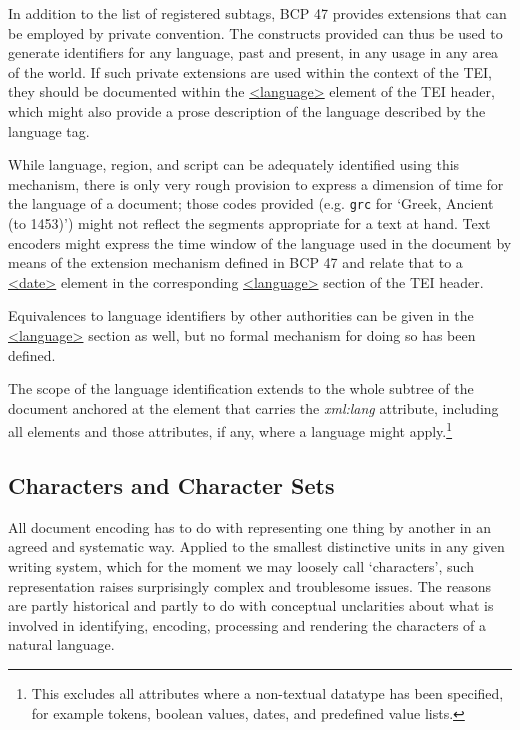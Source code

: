 In addition to the list of registered subtags, BCP 47 provides extensions that can be employed by private convention. The constructs provided can thus be used to generate identifiers for any language, past and present, in any usage in any area of the world. If such private extensions are used within the context of the TEI, they should be documented within the \hyperref[TEI.language]{<language>} element of the TEI header, which might also provide a prose description of the language described by the language tag.\par
While language, region, and script can be adequately identified using this mechanism, there is only very rough provision to express a dimension of time for the language of a document; those codes provided (e.g. \texttt{grc} for ‘Greek, Ancient (to 1453)’) might not reflect the segments appropriate for a text at hand. Text encoders might express the time window of the language used in the document by means of the extension mechanism defined in BCP 47 and relate that to a \hyperref[TEI.date]{<date>} element in the corresponding \hyperref[TEI.language]{<language>} section of the TEI header.\par
Equivalences to language identifiers by other authorities can be given in the \hyperref[TEI.language]{<language>} section as well, but no formal mechanism for doing so has been defined.\par
The scope of the language identification extends to the whole subtree of the document anchored at the element that carries the {\itshape xml:lang} attribute, including all elements and those attributes, if any, where a language might apply.\footnote{This excludes all attributes where a non-textual datatype has been specified, for example tokens, boolean values, dates, and predefined value lists.}
\subsection[{Characters and Character Sets}]{Characters and Character Sets}\label{CHCS}\par
All document encoding has to do with representing one thing by another in an agreed and systematic way. Applied to the smallest distinctive units in any given writing system, which for the moment we may loosely call ‘characters’, such representation raises surprisingly complex and troublesome issues. The reasons are partly historical and partly to do with conceptual unclarities about what is involved in identifying, encoding, processing and rendering the characters of a natural language.
